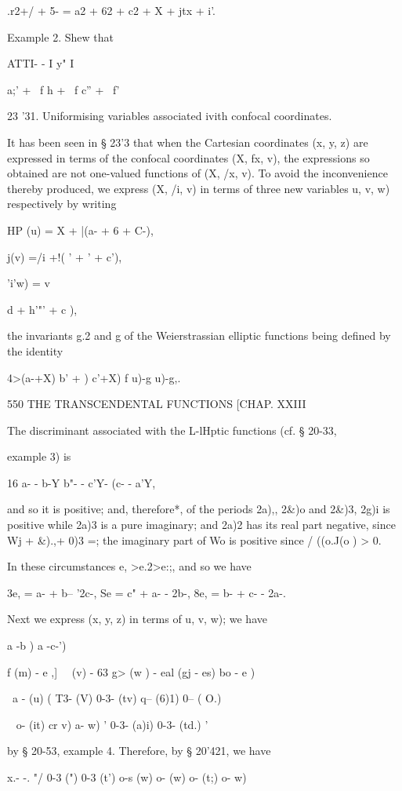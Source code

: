 {{.r2+/ + 5- = a2 + 62 + c2 + X + jtx + i'.

Example 2. Shew that

ATTI- - I y" I

   a;' + \ f h + \ f c'' + \ f'

23 '31. Uniformising variables associated ivith confocal coordinates.

It has been seen in § 23'3 that when the Cartesian coordinates (x, y,
z) are expressed in terms of the confocal coordinates (X, fx, v), the
expressions so obtained are not one-valued functions of (X, /x, v). To
avoid the inconvenience thereby produced, we express (X, /i, v) in
terms of three new variables u, v, w) respectively by writing

HP (u) = X + |(a- + 6 + C-),

 j(v) =/i +!( ' + ' + c'),

'i'w) = v \ \ {d + h'"' + c ),

the invariants g.2 and g of the Weierstrassian elliptic functions
being defined by the identity

4>(a-+X) b' + ) c'+X) f u)-g u)-g,.

550 THE TRANSCENDENTAL FUNCTIONS [CHAP. XXIII

The discriminant associated with the L-lHptic functions (cf. § 20-33,

example 3) is

16 a- - b-Y b"- - c'Y- (c- - a'Y,

and so it is positive; and, therefore*, of the periods 2a),, 2\&)o
and 2\&)3, 2g)i is positive while 2a)3 is a pure imaginary; and 2a)2
has its real part negative, since Wj + \&).,+ 0)3 =; the imaginary
part of Wo is positive since / ((o.J(o ) > 0.

In these circumstances e, >e.2>e:;, and so we have

3e, = a- + b-- '2c-, Se = c" + a- - 2b-, 8e, = b- + c- - 2a-.

Next we express (x, y, z) in terms of u, v, w); we have

 a -b ) a -c-')

   f (m) - e ,] \ \ (v) - 63 g> (w ) - eal (gj - es) bo - e )

\ a - (u) ( T3- (V) 0-3- (tv) q-- (6)1) 0-- ( O.)

~ o- (it) cr v) a- w) ' 0-3- (a)i) 0-3- (td.) '

by § 20-53, example 4. Therefore, by § 20'421, we have

x.- -. "/ 0-3 (") 0-3 (t') o-s (w) o- (w) o- (t;) o- w)

}}}
